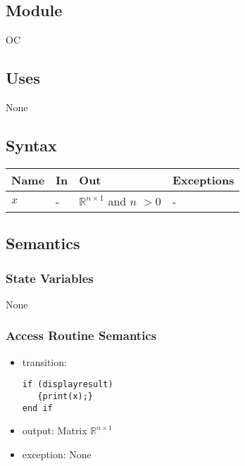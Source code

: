 \documentclass[12pt, titlepage]{article}
\begin{document}
\subsection{Module}

OC


\subsection{Uses}

None

\subsection{Syntax}

\begin{center}
\begin{tabular}{p{2cm} p{4cm} p{4cm} p{2cm}}
\hline
\textbf{Name} & \textbf{In} & \textbf{Out} & \textbf{Exceptions} \\
\hline


$x$ & - & $\mathbb{R}^{n \times 1}$ and $n$ $> 0$ & - \\
\hline
\end{tabular}
\end{center}

\subsection{Semantics}

\subsubsection{State Variables}

None

\subsubsection{Access Routine Semantics}

\noindent %
\begin{itemize}
\item transition: \begin{lstlisting}
if (displayresult)
   {print(x);}
end if
\end{lstlisting}
\item output: Matrix $\mathbb{R}^{n \times 1}$
\item exception: None%

\end{itemize}
\end{document}
